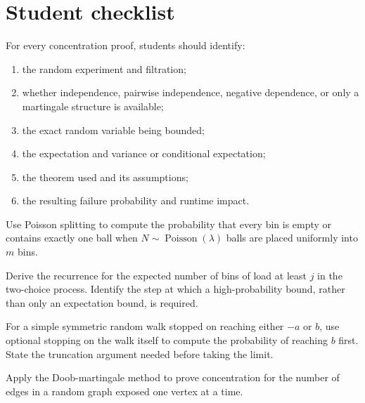\section{Student checklist}

For every concentration proof, students should identify:

\begin{enumerate}
\item the random experiment and filtration;
\item whether independence, pairwise independence, negative dependence, or
      only a martingale structure is available;
\item the exact random variable being bounded;
\item the expectation and variance or conditional expectation;
\item the theorem used and its assumptions;
\item the resulting failure probability and runtime impact.
\end{enumerate}

\begin{problem}
Use Poisson splitting to compute the probability that every bin is empty or
contains exactly one ball when $N\sim\operatorname{Poisson}(\lambda)$ balls
are placed uniformly into $m$ bins.
\end{problem}

\begin{problem}
Derive the recurrence for the expected number of bins of load at least $j$
in the two-choice process.  Identify the step at which a high-probability
bound, rather than only an expectation bound, is required.
\end{problem}

\begin{problem}
For a simple symmetric random walk stopped on reaching either $-a$ or $b$,
use optional stopping on the walk itself to compute the probability of
reaching $b$ first.  State the truncation argument needed before taking the
limit.
\end{problem}

\begin{problem}
Apply the Doob-martingale method to prove concentration for the number of
edges in a random graph exposed one vertex at a time.
\end{problem}
